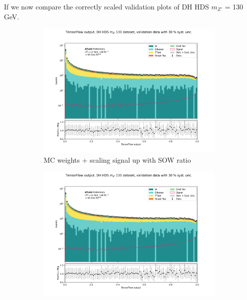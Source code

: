 \documentclass[14pt, a4paper]{book}
\begin{document}
If we now compare the correctly scaled validation plots of DH HDS $m_{Z'}$ = 130 GeV.
\graphicspath{{../../../Plots/TESTING/NeuralNetwork/BALANCED_WEIGHTING/MC_WGT_SIG_UP/}}
\begin{figure}[!ht]
	\centering
	\begin{subfigure}[b]{0.49\textwidth}
        \centering
        \includegraphics[width=1\textwidth]{DH_HDS_mZp_130/VAL.pdf}
        \caption{MC weights + scaling signal up with SOW ratio}%
     \end{subfigure}
     \hfill\graphicspath{{../../../Plots/TESTING/NeuralNetwork/BALANCED_WEIGHTING/ONLY_BALANCE_MC_EVENTS_BKG_DOWN/}}
     \begin{subfigure}[b]{0.49\textwidth}
        \centering
        \includegraphics[width=1\textwidth]{DH_HDS_mZp_130/VAL.pdf}

\end{subfigure}
\end{figure}
\end{document}
